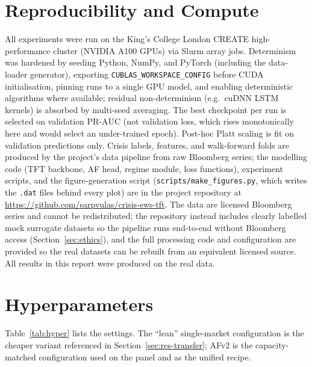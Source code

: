 \documentclass[11pt,a4paper]{article}
\newcommand{\prauc}{\mbox{PR-AUC}}
\begin{document}
\section{Reproducibility and Compute}
\label{app:repro}
All experiments were run on the King's College London CREATE high-performance
cluster (NVIDIA A100 GPUs) via Slurm array jobs. Determinism was hardened by
seeding Python, NumPy, and PyTorch (including the data-loader generator),
exporting \texttt{CUBLAS\_WORKSPACE\_CONFIG} before CUDA initialisation, pinning
runs to a single GPU model, and enabling deterministic algorithms where
available; residual non-determinism (e.g.\ cuDNN LSTM kernels) is absorbed by
multi-seed averaging. The best checkpoint per run is selected on validation
$\prauc$ (not validation loss, which rises monotonically here and would select
an under-trained epoch). Post-hoc Platt scaling is fit on validation
predictions only. Crisis labels, features, and walk-forward folds are produced
by the project's data pipeline from raw Bloomberg series; the modelling code
(TFT backbone, AF head, regime module, loss functions), experiment scripts, and
the figure-generation script (\texttt{scripts/make\_figures.py}, which writes
the \texttt{.dat} files behind every plot) are in the project repository at
\url{https://github.com/sarpvulas/crisis-ews-tft}. The data are licensed
Bloomberg series and cannot be redistributed; the repository instead includes
clearly labelled mock surrogate datasets so the pipeline runs end-to-end
without Bloomberg access (Section~\ref{sec:ethics}), and the full processing
code and configuration are provided so the real datasets can be rebuilt from
an equivalent licensed source. All results in this report were produced on
the real data.

\section{Hyperparameters}
\label{app:hyper}
Table~\ref{tab:hyper} lists the settings. The ``lean'' single-market
configuration is the cheaper variant referenced in
Section~\ref{sec:res-transfer}; AFv2 is the capacity-matched configuration used
on the panel and as the unified recipe.
\end{document}
